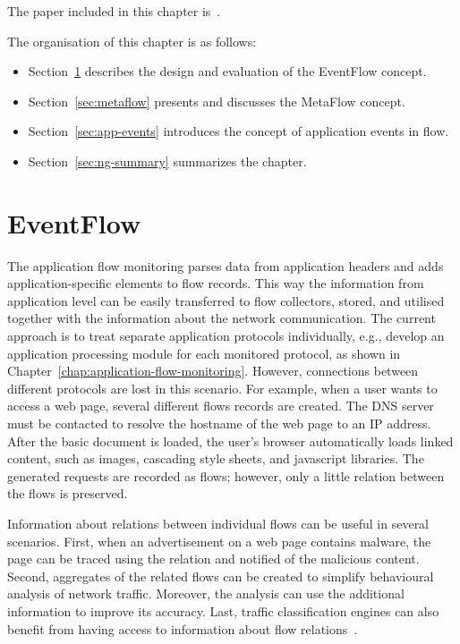 \begin{chapintro}
The paper included in this chapter is~\cite{Velan-2016-EventFlow}.

The organisation of this chapter is as follows:
\begin{itemize}
  \item Section~\ref{sec:eventflow} describes the design and evaluation of the EventFlow concept.
  \item Section~\ref{sec:metaflow} presents and discusses the MetaFlow concept.
  \item Section~\ref{sec:app-events} introduces the concept of application events in flow.
  \item Section~\ref{sec:ng-summary} summarizes the chapter.
\end{itemize}

\end{chapintro}

\newpage

\section{EventFlow}\label{sec:eventflow}

The application flow monitoring parses data from application headers and adds application-specific elements to flow records. This way the information from application level can be easily transferred to flow collectors, stored, and utilised together with the information about the network communication. The current approach is to treat separate application protocols individually, e.g., develop an application processing module for each monitored protocol, as shown in Chapter~\ref{chap:application-flow-monitoring}. However, connections between different protocols are lost in this scenario. For example, when a user wants to access a web page, several different flows records are created. The DNS server must be contacted to resolve the hostname of the web page to an IP address. After the basic document is loaded, the user's browser automatically loads linked content, such as images, cascading style sheets, and javascript libraries. The generated requests are recorded as flows; however, only a little relation between the flows is preserved.

Information about relations between individual flows can be useful in several scenarios. First, when an advertisement on a web page contains malware, the page can be traced using the relation and notified of the malicious content. Second, aggregates of the related flows can be created to simplify behavioural analysis of network traffic. Moreover, the analysis can use the additional information to improve its accuracy. Last, traffic classification engines can also benefit from having access to information about flow relations~\cite{Wang-2014-Internet}.

